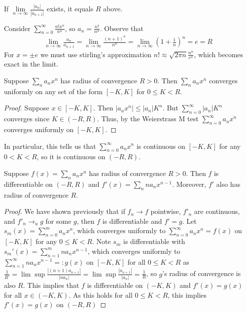 \begin{corollary}
    If $\lim\limits_{n\rightarrow \infty}\frac{|a_n|}{|a_{n+1}|}$ exists, it equals $R$ above.
\end{corollary}

\begin{example}
    Consider $\sum_{n=0}^{\infty}\frac{n!x^n}{n^n}$, so $a_n = \frac{n!}{n^n}$. Observe that \begin{align*}
        \lim\limits_{n\rightarrow \infty}\frac{a_n}{a_{n+1}} = \lim\limits_{n\rightarrow \infty}\frac{(n+1)^n}{n^n} = \lim\limits_{n\rightarrow \infty}\left(1+\frac{1}{n}\right)^n = e = R
    \end{align*}
    For $x = \pm e$ we must use stirling's approximation $n! \approx \sqrt{2\pi n}\frac{n^n}{e^n}$, which becomes exact in the limit.
\end{example}


\begin{proposition}
    Suppose $\sum_{n}a_nx^n$ has radius of convergence $R > 0$. Then $\sum_na_nx^n$ converges uniformly on any set of the form $[-K,K]$ for $0 \leq K < R$.
\end{proposition}
\begin{proof}
    Suppose $x \in [-K,K]$. Then $|a_nx^n| \leq |a_n|K^n$. But $\sum_{n=0}^{\infty}|a_n|K^n$ converges since $K \in (-R,R)$. Thus, by the Weierstrass M test $\sum_{n=0}^{\infty}a_nx^n$ converges uniformly on $[-K,K]$.
\end{proof}
In particular, this tells us that $\sum_{n=0}^{\infty}a_nx^n$ is continuous on $[-K,K]$ for any $0 < K < R$, so it is continuous on $(-R,R)$.

\begin{proposition}
    Suppose $f(x) = \sum_na_nx^n$ has radius of convergence $R > 0$. Then $f$ is differentiable on $(-R,R)$ and $f'(x) = \sum_nna_nx^{n-1}$. Moreover, $f'$ also has radius of convergence $R$.
\end{proposition}
\begin{proof}
    We have shown previously that if $f_n\rightarrow f$ pointwise, $f'_n$ are continuous, and $f'_n\rightarrow_ug$ for some $g$, then $f$ is differentiable and $f' = g$. Let $s_m(x) = \sum_{n=0}^ma_nx^n$, which converges uniformly to $\sum_{n=0}^{\infty}a_nx^n=f(x)$ on $[-K,K]$ for any $0 \leq K < R$. Note $s_m$ is differentiable with $s_m'(x) = \sum_{n=1}^mna_nx^{n-1}$, which converges uniformly to $\sum_{n=1}^{\infty}na_nx^{n-1} =: g(x)$ on $[-K,K]$ for all $0 \leq K < R$ as $\frac{1}{R'} = \lim\sup\frac{|(n+1)a_{n+1}|}{|na_n|} = \lim\sup\frac{|a_{n+1}|}{|a_n|} = \frac{1}{R}$, so $g$'s radius of convergence is also $R$. This implies that $f$ is differentiable on $(-K,K)$ and $f'(x) = g(x)$ for all $x \in (-K,K)$. As this holds for all $0 \leq K < R$, this implies $f'(x) = g(x)$ on $(-R,R)$
\end{proof}

